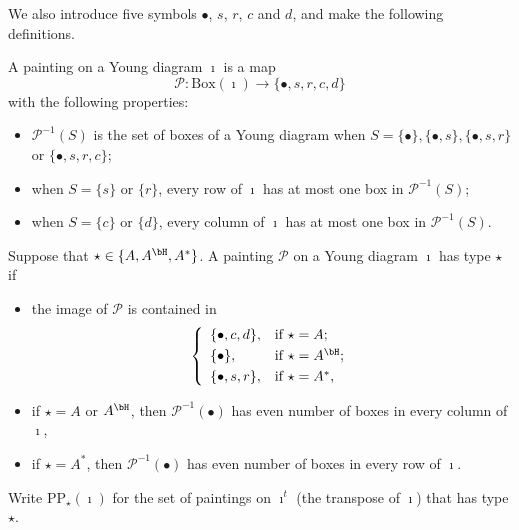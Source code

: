 \documentclass[counting_main.tex]{subfiles}
\begin{document}

\renewcommand{\CP}{\mathcal{P}}
We also introduce five symbols $\bullet$, $s$, $r$, $c$ and $d$, and make the following definitions.
\begin{defn}
A painting on a Young diagram $\imath$ is a map
\[
  \mathcal P: \mathrm{Box}(\imath) \rightarrow \{\bullet, s, r, c, d \}
\]
with the following properties:
\begin{itemize}
\item
 $\mathcal P^{-1}(S)$ is the set of boxes of a Young diagram when $S=\{\bullet\}, \{\bullet, s \}, \{\bullet, s, r\}$ or $\{\bullet, s, r, c \} $;
 \item
 when $S=\{s\}$ or $ \{r\}$, every row of $\imath$ has at most one  box in $\CP^{-1}(S)$;
   \item
 when $S=\{c\}$ or $ \{d \}$, every column of $\imath$ has at most one  box in $\CP^{-1}(S)$.
 \end{itemize}
\end{defn}



\begin{defn}\label{defpbp0}
Suppose that $\star\in \{A, A^\bH, A^*\}$.  A painting $\CP$ on a Young diagram $\imath$ has type $\star$ if
 \begin{itemize}
   \item
 the image of $\CP$ is contained in
 \[
 \left\{
     \begin{array}{ll}
         \{\bullet, c, d\}, &\hbox{if $\star=A$}; \smallskip\\
            \{\bullet\}, &\hbox{if $\star=A^\bH$}; \smallskip\\
          \{\bullet, s, r\}, &\hbox{if $\star=A^*$},            \end{array}
   \right.
 \]
 \item
 if $\star=A$ or $A^\bH$, then $\CP^{-1}(\bullet)$ has even number of boxes in every column of $\imath$,
  \item
 if $\star=A^*$, then $\CP^{-1}(\bullet)$ has even number of boxes in every row of $\imath$.
 \end{itemize}
 Write $\mathrm{PP}_\star(\imath)$ for the set of paintings on $\imath^t$ (the transpose of $\imath$) that has type $\star$.
 \end{defn}
\end{document}
